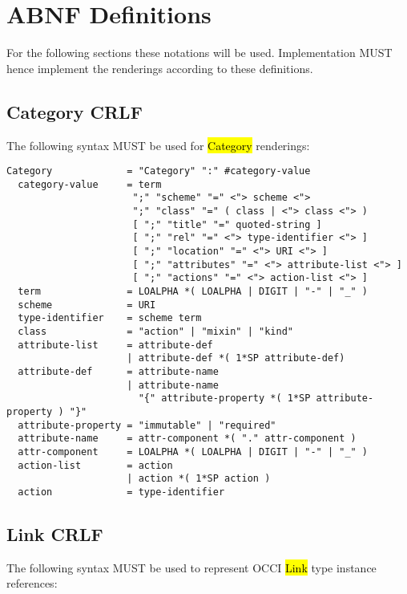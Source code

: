 \documentclass[10pt,a4paper]{article}
\begin{document}
\section{ABNF Definitions}

For the following sections these notations will be used. Implementation MUST hence implement the renderings according to these definitions.

\subsection{Category CRLF}

The following syntax MUST be used for \hl{Category} renderings:

\begin{verbatim}
Category             = "Category" ":" #category-value
  category-value     = term
                      ";" "scheme" "=" <"> scheme <">
                      ";" "class" "=" ( class | <"> class <"> )
                      [ ";" "title" "=" quoted-string ]
                      [ ";" "rel" "=" <"> type-identifier <"> ]
                      [ ";" "location" "=" <"> URI <"> ]
                      [ ";" "attributes" "=" <"> attribute-list <"> ]
                      [ ";" "actions" "=" <"> action-list <"> ]
  term               = LOALPHA *( LOALPHA | DIGIT | "-" | "_" )
  scheme             = URI
  type-identifier    = scheme term
  class              = "action" | "mixin" | "kind"
  attribute-list     = attribute-def
                     | attribute-def *( 1*SP attribute-def)
  attribute-def      = attribute-name
                     | attribute-name
                       "{" attribute-property *( 1*SP attribute-property ) "}"
  attribute-property = "immutable" | "required"
  attribute-name     = attr-component *( "." attr-component )
  attr-component     = LOALPHA *( LOALPHA | DIGIT | "-" | "_" )
  action-list        = action
                     | action *( 1*SP action )
  action             = type-identifier
\end{verbatim}

\subsection{Link CRLF}

The following syntax MUST be used to represent OCCI \hl{Link} type
instance references:
\end{document}
